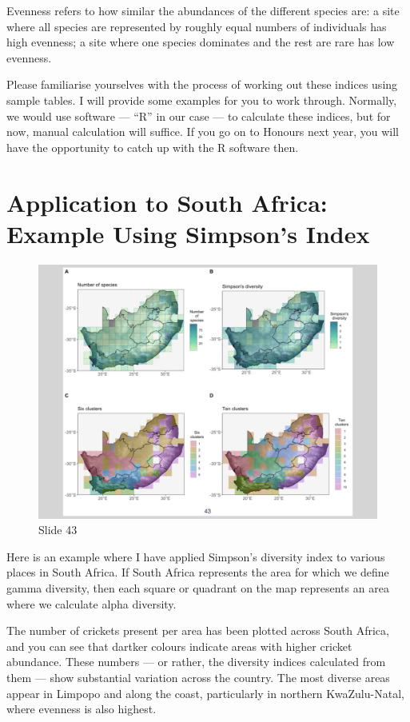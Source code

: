 \documentclass[
  10pt,
]{book}
\begin{document}
Evenness refers to how similar the abundances of the different species
are: a site where all species are represented by roughly equal numbers
of individuals has high evenness; a site where one species dominates and
the rest are rare has low evenness.

Please familiarise yourselves with the process of working out these
indices using sample tables. I will provide some examples for you to
work through. Normally, we would use software --- ``R'' in our case ---
to calculate these indices, but for now, manual calculation will
suffice. If you go on to Honours next year, you will have the
opportunity to catch up with the R software then.

\section{Application to South Africa: Example Using Simpson's
Index}\label{application-to-south-africa-example-using-simpsons-index}

\begin{figure}[ht]
\centering
\includegraphics[width=0.8\linewidth]{../images/BDC334/BDC334-043.jpeg}
\caption*{Slide 43}
\end{figure}

Here is an example where I have applied Simpson's diversity index to
various places in South Africa. If South Africa represents the area for
which we define gamma diversity, then each square or quadrant on the map
represents an area where we calculate alpha diversity.

The number of crickets present per area has been plotted across South
Africa, and you can see that dartker colours indicate areas with higher
cricket abundance. These numbers --- or rather, the diversity indices
calculated from them --- show substantial variation across the country.
The most diverse areas appear in Limpopo and along the coast,
particularly in northern KwaZulu-Natal, where evenness is also highest.
\end{document}
